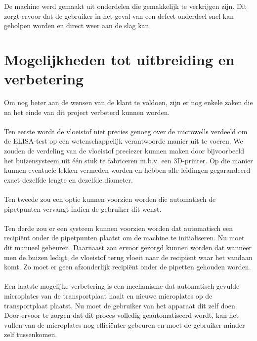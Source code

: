 \documentclass[a4paper,twoside,kulak]{kulakreport} %
\begin{document}
De machine werd gemaakt uit onderdelen die gemakkelijk te verkrijgen zijn. Dit zorgt ervoor dat de gebruiker in het geval van een defect onderdeel snel kan geholpen worden en direct weer aan de slag kan.

\chapter{Mogelijkheden tot uitbreiding en verbetering}

Om nog beter aan de wensen van de klant te voldoen, zijn er nog enkele zaken die na het einde van dit project verbeterd kunnen worden. \\ \\
Ten eerste wordt de vloeistof niet precies genoeg over de microwells verdeeld om de ELISA-test op een wetenschappelijk verantwoorde manier uit te voeren. We zouden de verdeling van de vloeistof preciezer kunnen maken door bijvoorbeeld het buizensysteem uit één stuk te fabriceren m.b.v. een 3D-printer. Op die manier kunnen eventuele lekken vermeden worden en hebben alle leidingen gegarandeerd exact dezelfde lengte en dezelfde diameter. \\ \\
Ten tweede zou een optie kunnen voorzien worden die automatisch de pipetpunten vervangt indien de gebruiker dit wenst. 
\\ \\
Ten derde zou er een systeem kunnen voorzien worden dat automatisch een recipiënt onder de pipetpunten plaatst om de machine te initialiseren. Nu moet dit manueel gebeuren. Daarnaast zou ervoor gezorgd kunnen worden dat wanneer men de buizen ledigt, de vloeistof terug vloeit naar de recipiënt waar het vandaan komt. Zo moet er geen afzonderlijk recipiënt onder de pipetten gehouden worden. 
\\ \\
Een laatste mogelijke verbetering is een mechanisme dat automatisch gevulde microplates  van de transportplaat haalt en nieuwe microplates op de transportplaat plaatst. Nu moet de gebruiker van het apparaat dit zelf doen. Door ervoor te zorgen dat dit proces volledig geautomatiseerd wordt, kan het vullen van de microplates nog efficiënter gebeuren en moet de gebruiker minder zelf tussenkomen. \\ \\

\end{document}
